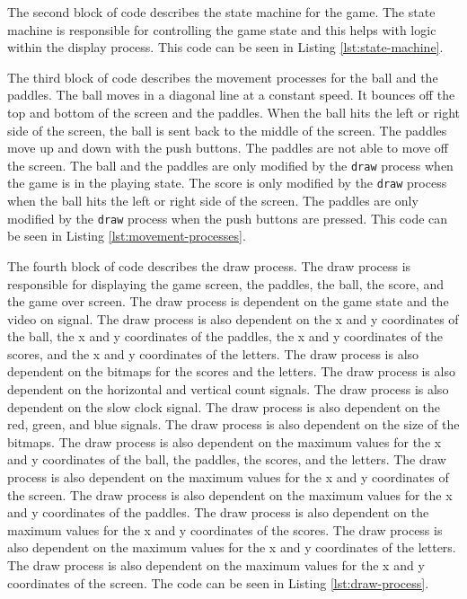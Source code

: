 \documentclass{article}
\newcommand{\code}[1]{\lstinline|#1|}
\begin{document}
The second block of code describes the state machine for the game. The state machine is responsible for controlling the game state and this helps with logic within the display process. 
This code can be seen in Listing \ref{lst:state-machine}.

The third block of code describes the movement processes for the ball and the paddles. The ball moves in a diagonal line at a constant speed. It bounces off the top and bottom of the screen and the paddles. When the ball hits the left or right side of the screen, the ball is sent back to the middle of the screen. The paddles move up and down with the push buttons. The paddles are not able to move off the screen. The ball and the paddles are only modified by the \code{draw} process when the game is in the playing state. The score is only modified by the \code{draw} process when the ball hits the left or right side of the screen. The paddles are only modified by the \code{draw} process when the push buttons are pressed. This code can be seen in Listing \ref{lst:movement-processes}.

The fourth block of code describes the draw process. The draw process is responsible for displaying the game screen, the paddles, the ball, the score, and the game over screen. The draw process is dependent on the game state and the video on signal. The draw process is also dependent on the x and y coordinates of the ball, the x and y coordinates of the paddles, the x and y coordinates of the scores, and the x and y coordinates of the letters. The draw process is also dependent on the bitmaps for the scores and the letters. The draw process is also dependent on the horizontal and vertical count signals. The draw process is also dependent on the slow clock signal. The draw process is also dependent on the red, green, and blue signals. The draw process is also dependent on the size of the bitmaps. The draw process is also dependent on the maximum values for the x and y coordinates of the ball, the paddles, the scores, and the letters. The draw process is also dependent on the maximum values for the x and y coordinates of the screen. The draw process is also dependent on the maximum values for the x and y coordinates of the paddles. The draw process is also dependent on the maximum values for the x and y coordinates of the scores. The draw process is also dependent on the maximum values for the x and y coordinates of the letters. The draw process is also dependent on the maximum values for the x and y coordinates of the screen. 
The code can be seen in Listing \ref{lst:draw-process}.
\end{document}
